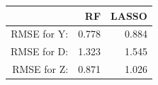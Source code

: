 \begin{table}[ht]
\centering
\begin{tabular}{rrr}
  \hline
 & RF & LASSO \\ 
  \hline
RMSE for Y: & 0.778 & 0.884 \\ 
  RMSE for D: & 1.323 & 1.545 \\ 
  RMSE for Z: & 0.871 & 1.026 \\ 
   \hline
\end{tabular}
\end{table}
